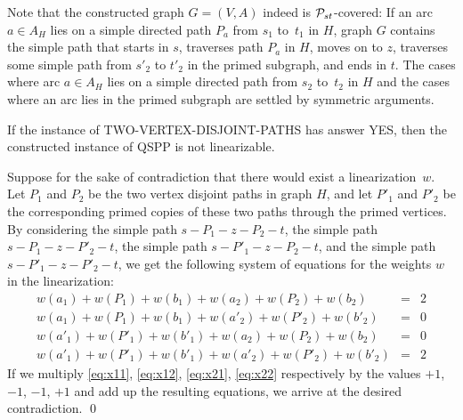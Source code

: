 \documentclass[11pt,fleqn]{article}
\begin{document}
Note that the constructed graph $G=(V,A)$ indeed is ${\cal P}_{st}$-covered:
If an arc $a\in A_H$ lies on a simple directed path $P_a$ from $s_1$ to~$t_1$ in $H$,
graph $G$ contains the simple path that starts in $s$, traverses path $P_a$ in $H$, moves on to $z$,
traverses some simple path from $s'_2$ to $t'_2$ in the primed subgraph, and ends in $t$.
The cases where arc $a\in A_H$ lies on a simple directed path from $s_2$ to~$t_2$ in $H$ 
and the cases where an arc lies in the primed subgraph are settled by symmetric arguments.
\begin{lemma}
\label{le:hard.1}
If the instance of TWO-VERTEX-DISJOINT-PATHS has answer YES,
then the constructed instance of QSPP is not linearizable.
\end{lemma}
\proof
Suppose for the sake of contradiction that there would exist a linearization~$w$.
Let $P_1$ and $P_2$ be the two vertex disjoint paths in graph $H$, and let $P'_1$ and $P'_2$
be the corresponding primed copies of these two paths through the primed vertices.
By considering 
the simple path $s-P_1-z-P_2-t$,  
the simple path $s-P_1-z-P'_2-t$,  
the simple path $s-P'_1-z-P_2-t$, and 
the simple path $s-P'_1-z-P'_2-t$, 
we get the following system of equations for the weights $w$ in the linearization:
\begin{eqnarray}
w(a_1) +w(P_1 )+w(b_1) +w(a_2) +w(P_2 )+w(b_2)  &=& 2 \label{eq:x11} \\[0.5ex]
w(a_1) +w(P_1 )+w(b_1) +w(a'_2)+w(P'_2)+w(b'_2) &=& 0 \label{eq:x12} \\[0.5ex]
w(a'_1)+w(P'_1)+w(b'_1)+w(a_2) +w(P_2 )+w(b_2)  &=& 0 \label{eq:x21} \\[0.5ex]
w(a'_1)+w(P'_1)+w(b'_1)+w(a'_2)+w(P'_2)+w(b'_2) &=& 2 \label{eq:x22} 
\end{eqnarray}
If we multiply \eqref{eq:x11}, \eqref{eq:x12}, \eqref{eq:x21}, \eqref{eq:x22}
respectively by the values $+1$, $-1$, $-1$, $+1$ and add up the resulting equations,
we arrive at the desired contradiction.
\qed
\end{document}
